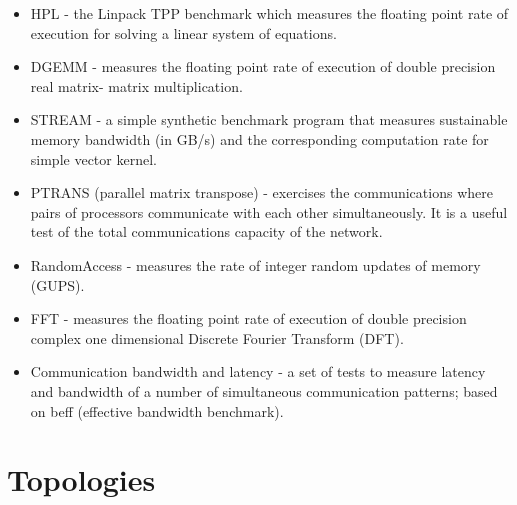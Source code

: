 \begin{itemize}
    \item HPL - the Linpack TPP benchmark which measures the floating point
    rate of execution for solving a linear system of equations.
    \item DGEMM - measures the floating point rate of execution of double
    precision real matrix- matrix multiplication.
    \item STREAM - a simple synthetic benchmark program that measures sustainable
    memory bandwidth (in GB/s) and the corresponding computation rate for
    simple vector kernel.
    \item PTRANS (parallel matrix transpose) - exercises the communications where
    pairs of processors communicate with each other simultaneously. It is a useful test
    of the total communications capacity of the network. 
    \item RandomAccess - measures the rate of integer random updates of memory
    (GUPS).
    \item FFT - measures the floating point rate of execution of double precision
    complex one dimensional Discrete Fourier Transform (DFT).
    \item Communication bandwidth and latency - a set of tests to measure latency
    and bandwidth of a number of simultaneous communication patterns; based on beff
    (effective bandwidth benchmark).
\end{itemize}



\section{Topologies}
\noindent

\clearpage
